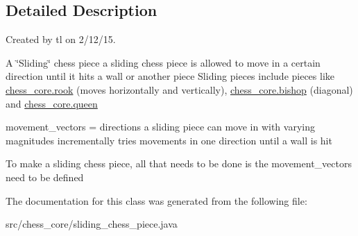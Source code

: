 \subsection{Detailed Description}
Created by tl on 2/12/15.

A \char`\"{}\+Sliding\char`\"{} chess piece a sliding chess piece is allowed to move in a certain direction until it hits a wall or another piece Sliding pieces include pieces like \hyperlink{classchess__core_1_1rook}{chess\+\_\+core.\+rook} (moves horizontally and vertically), \hyperlink{classchess__core_1_1bishop}{chess\+\_\+core.\+bishop} (diagonal) and \hyperlink{classchess__core_1_1queen}{chess\+\_\+core.\+queen}

movement\+\_\+vectors = directions a sliding piece can move in with varying magnitudes incrementally tries movements in one direction until a wall is hit

To make a sliding chess piece, all that needs to be done is the movement\+\_\+vectors need to be defined 

The documentation for this class was generated from the following file\+:\begin{DoxyCompactItemize}
\item 
src/chess\+\_\+core/sliding\+\_\+chess\+\_\+piece.\+java\end{DoxyCompactItemize}
